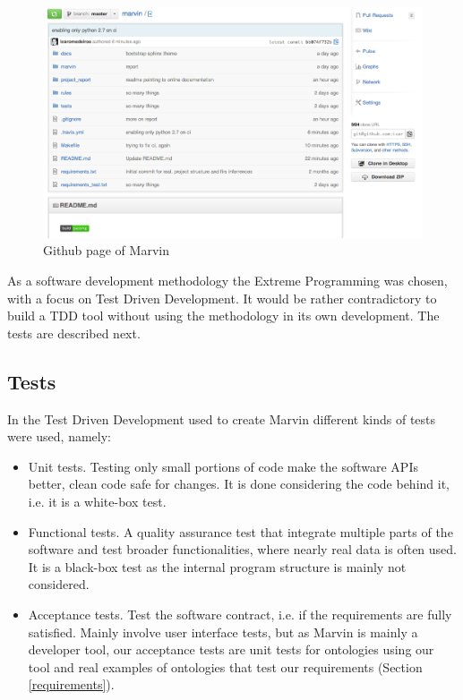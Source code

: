 \documentclass{report}
\begin{document}
\begin{figure}[!hbt]
    \centering
    \label{figGithub}
    \caption{Github page of Marvin}
    \includegraphics[scale=0.4]{fig/github.png}
\end{figure}

As a software development methodology the Extreme Programming \cite{beck04} was chosen, with a focus on Test Driven
Development. It would be rather contradictory to build a TDD tool without using the methodology in its own development.
The tests are described next.

\subsection{Tests}
\label{tests}

In the Test Driven Development used to create Marvin different kinds of tests were used, namely:

\begin{itemize}
    \item Unit tests. Testing only small portions of code make the software APIs better, clean code safe for changes.
        It is done considering the code behind it, i.e. it is a white-box test.
    \item Functional tests. A quality assurance test that integrate multiple parts of the software and test broader
        functionalities, where nearly real data is often used.
        It is a black-box test as the internal program structure is mainly not considered.
    \item Acceptance tests. Test the software contract, i.e. if the requirements are fully satisfied. Mainly involve
        user interface tests, but as Marvin is mainly a developer tool, our acceptance tests are unit tests for ontologies
        using our tool and real examples of ontologies that test our requirements (Section \ref{requirements}).
\end{itemize}
\end{document}
